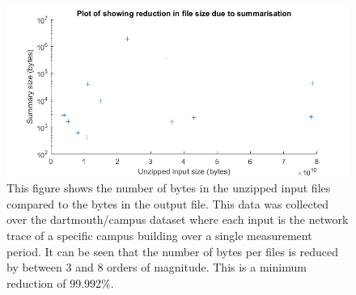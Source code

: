 \begin{figure}[h]
    \centering
    \includegraphics[width=\textwidth]{size_red.png}
    \caption{This figure shows the number of bytes in the unzipped input files compared to the bytes in the output file. This data was collected over the dartmouth/campus dataset where each input is the network trace of a specific campus building over a single measurement period. It can be seen that the number of bytes per files is reduced by between 3 and 8 orders of magnitude. This is a minimum reduction of 99.992\%.}
    \label{fig:size_red}
\end{figure}


